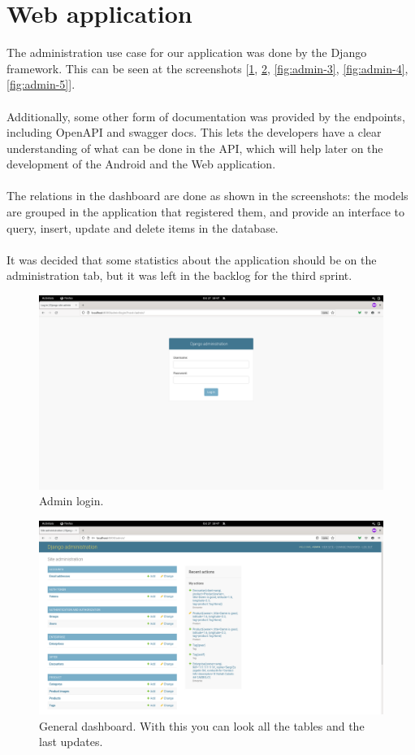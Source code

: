 \documentclass[./main.tex]{subfiles}
\begin{document}
\section{Web application}
The administration use case for our application was
done by the Django framework. This can be seen at the screenshots [\ref{fig:admin-1}, \ref{fig:admin-2}, 
\ref{fig:admin-3}, \ref{fig:admin-4}, \ref{fig:admin-5}].
\\
\\
Additionally, some other
form of documentation was provided by the endpoints, including OpenAPI
and swagger docs. This lets the developers have a clear understanding of
what can be done in the API, which will help later on the development of
the Android and the Web application.
\\
\\
The relations in the dashboard are done as shown in the screenshots: the
models are grouped in the application that registered them, and provide
an interface to query, insert, update and delete items in the database.
\\
\\
It was decided that some statistics about the application should be on
the administration tab, but it was left in the backlog for the third
sprint.

\begin{figure}[H]
	\centering
	\includegraphics[width=0.9\linewidth]{img/admin-img-1.png}
	\caption{Admin login.}
	\label{fig:admin-1}
\end{figure}

\begin{figure}[H]
	\centering
	\includegraphics[width=0.9\linewidth]{img/admin-img-2.png}
	\caption{General dashboard. With this you can look all the tables and the last updates.}
	\label{fig:admin-2}
\end{figure}
\end{document}

